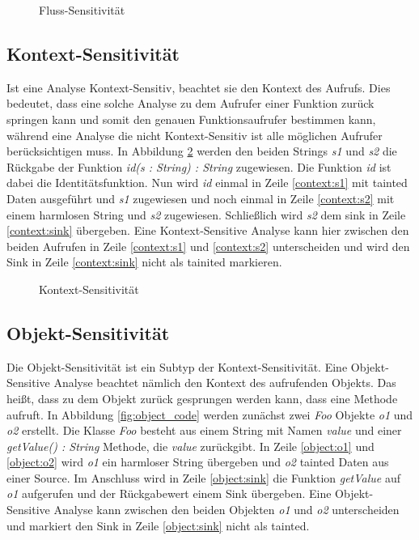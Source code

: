 \documentclass[runningheads]{llncs}
\begin{document}
\begin{figure}

\caption{Fluss-Sensitivität}
\label{fig:fluss_code}
\end{figure}

\subsection{Kontext-Sensitivität}
Ist eine Analyse Kontext-Sensitiv, beachtet sie den Kontext des Aufrufs. Dies bedeutet, dass eine solche Analyse zu dem Aufrufer einer Funktion zurück springen kann und somit den genauen Funktionsaufrufer bestimmen kann, während eine Analyse die nicht Kontext-Sensitiv ist alle möglichen Aufrufer berücksichtigen muss.
In Abbildung \ref{fig:context_code} werden den beiden Strings \emph{s1} und \emph{s2} die Rückgabe der Funktion \emph{id(s : String) : String} zugewiesen. Die Funktion \emph{id} ist dabei die Identitätsfunktion. Nun wird \emph{id} einmal in Zeile \ref{context:s1} mit tainted Daten ausgeführt und \emph{s1} zugewiesen und noch einmal in Zeile \ref{context:s2} mit einem harmlosen String und \emph{s2} zugewiesen. Schließlich wird \emph{s2} dem sink in Zeile \ref{context:sink} übergeben. Eine Kontext-Sensitive Analyse kann hier zwischen den beiden Aufrufen in Zeile \ref{context:s1} und \ref{context:s2} unterscheiden und wird den Sink in Zeile \ref{context:sink} nicht als tainited markieren.
 
\begin{figure}

\caption{Kontext-Sensitivität}
\label{fig:context_code}
\end{figure}

\subsection{Objekt-Sensitivität}
Die Objekt-Sensitivität ist ein Subtyp der Kontext-Sensitivität. Eine Objekt-Sensitive Analyse beachtet nämlich den Kontext des aufrufenden Objekts. Das heißt, dass zu dem Objekt zurück gesprungen werden kann, dass eine Methode aufruft.
In Abbildung \ref{fig:object_code} werden zunächst zwei \emph{Foo} Objekte \emph{o1} und \emph{o2} erstellt. Die Klasse \emph{Foo}  besteht aus einem String mit Namen \emph{value} und einer \emph{getValue() : String} Methode, die \emph{value} zurückgibt. In Zeile \ref{object:o1} und \ref{object:o2} wird \emph{o1} ein harmloser String übergeben und \emph{o2} tainted Daten aus einer Source. Im Anschluss wird in Zeile \ref{object:sink} die Funktion \emph{getValue} auf \emph{o1} aufgerufen und der Rückgabewert einem Sink übergeben. Eine Objekt-Sensitive Analyse kann zwischen den beiden Objekten \emph{o1} und \emph{o2} unterscheiden und markiert den Sink in Zeile \ref{object:sink} nicht als tainted. 
\end{document}
